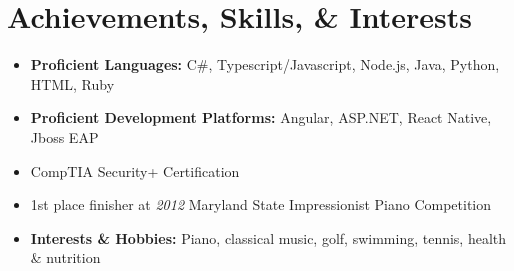 \documentclass[11pt,letterpaper,sans]{moderncv}        %
\begin{document}
\section{Achievements, Skills, \& Interests}

\begin{itemize}[leftmargin=0.2in]
\setlength\itemsep{-3pt}
\item \textbf{Proficient Languages:} C\#, Typescript/Javascript, Node.js, Java, Python, HTML, Ruby
\item \textbf{Proficient Development Platforms:} Angular, ASP.NET, React Native, Jboss EAP
\item CompTIA Security+ Certification
\item 1st place finisher at \textit{2012} Maryland State Impressionist Piano Competition
\item \textbf{Interests \& Hobbies:} Piano, classical music, golf, swimming, tennis, health \& nutrition

\end{itemize}
\end{document}

